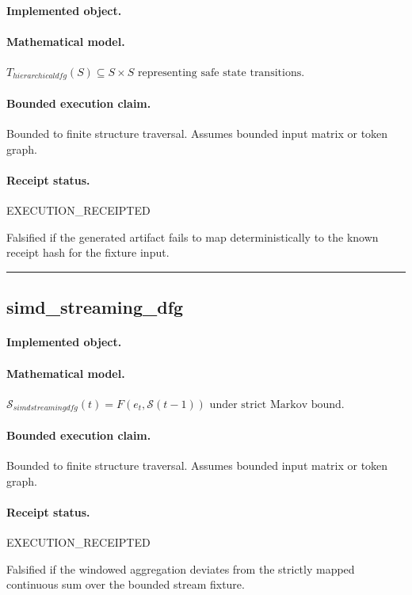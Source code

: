 \paragraph{Implemented object.} 
\paragraph{Mathematical model.} $T_{hierarchicaldfg}(S) \subseteq S \times S \text{ representing safe state transitions}.$
\paragraph{Bounded execution claim.} Bounded to finite structure traversal. Assumes bounded input matrix or token graph.
\paragraph{Receipt status.} EXECUTION\_RECEIPTED
\begin{falsifier}
Falsified if the generated artifact fails to map deterministically to the known receipt hash for the fixture input.
\end{falsifier}

\vspace{1em}\hrule\vspace{1em}
\subsection{simd\_streaming\_dfg}
\paragraph{Implemented object.} 
\paragraph{Mathematical model.} $\mathcal{S}_{simdstreamingdfg}(t) = F(e_t, \mathcal{S}(t-1)) \text{ under strict Markov bound}.$
\paragraph{Bounded execution claim.} Bounded to finite structure traversal. Assumes bounded input matrix or token graph.
\paragraph{Receipt status.} EXECUTION\_RECEIPTED
\begin{falsifier}
Falsified if the windowed aggregation deviates from the strictly mapped continuous sum over the bounded stream fixture.
\end{falsifier}

